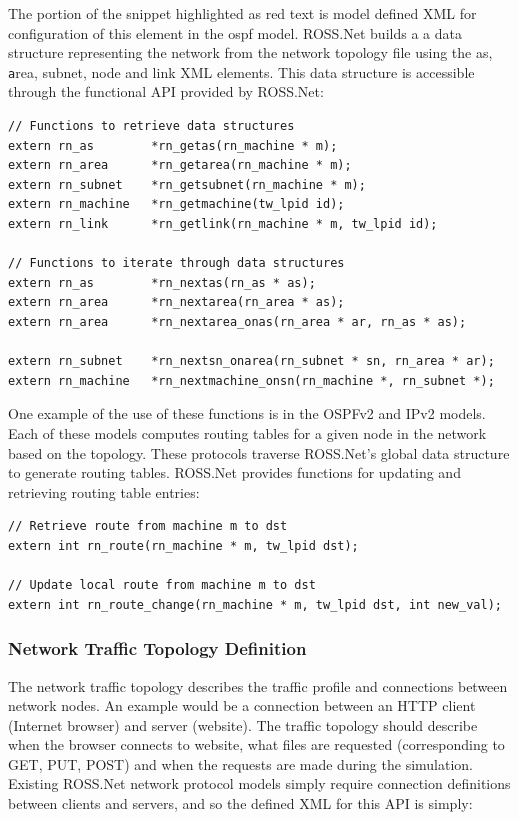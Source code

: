 \documentclass[12pt]{article}
\begin{document}
The portion of the snippet highlighted as red text is model defined XML for
 configuration of this element in the ospf model.  ROSS.Net builds a a data
 structure representing the network from the network topology file using the
 as, {\texttt area, subnet, node} and link XML elements.  This data structure
 is accessible through the functional API provided by ROSS.Net:

\begin{small}\begin{verbatim}
// Functions to retrieve data structures
extern rn_as        *rn_getas(rn_machine * m);
extern rn_area      *rn_getarea(rn_machine * m);
extern rn_subnet    *rn_getsubnet(rn_machine * m);
extern rn_machine   *rn_getmachine(tw_lpid id);
extern rn_link      *rn_getlink(rn_machine * m, tw_lpid id);

// Functions to iterate through data structures
extern rn_as        *rn_nextas(rn_as * as);
extern rn_area      *rn_nextarea(rn_area * as);
extern rn_area      *rn_nextarea_onas(rn_area * ar, rn_as * as);

extern rn_subnet    *rn_nextsn_onarea(rn_subnet * sn, rn_area * ar);
extern rn_machine   *rn_nextmachine_onsn(rn_machine *, rn_subnet *);
\end{verbatim}\end{small}


One example of the use of these functions is in the OSPFv2 and IPv2 models.
Each of these models computes routing tables for a given node in the network
based on the topology.  These protocols traverse ROSS.Net's global data
structure to generate routing tables.  ROSS.Net provides functions for
updating and retrieving routing table entries:

\begin{small}
\begin{verbatim}
// Retrieve route from machine m to dst
extern int rn_route(rn_machine * m, tw_lpid dst);

// Update local route from machine m to dst
extern int rn_route_change(rn_machine * m, tw_lpid dst, int new_val);
\end{verbatim}
\end{small}

\subsubsection{Network Traffic Topology Definition}

The network traffic topology describes the traffic profile and connections
 between network nodes.  An example would be a connection between an HTTP
 client (Internet browser) and server (website).  The traffic topology should
 describe when the browser connects to website, what files are requested
 (corresponding to GET, PUT, POST) and when the requests are made during the
 simulation.  Existing ROSS.Net network protocol models simply require
 connection definitions between clients and servers, and so the defined XML
 for this API is simply:
\end{document}
